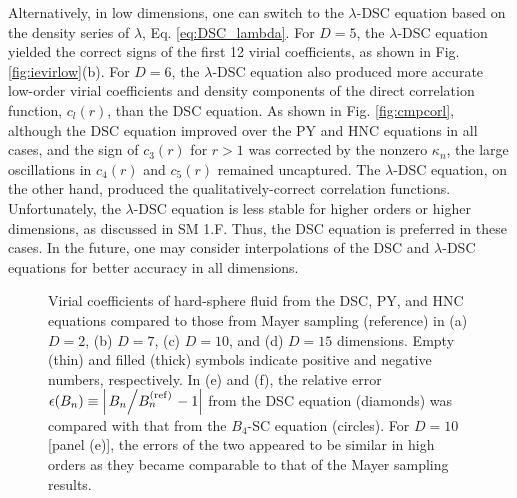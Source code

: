 \documentclass[aip,jcp,preprint,superscriptaddress,showpacs,preprintnumbers,amsmath,amssymb]{revtex4-1}
\begin{document}
Alternatively, in low dimensions,
one can switch to the $\lambda$-DSC equation
based on the density series of $\lambda$,
Eq. \eqref{eq:DSC_lambda}.
%
For $D = 5$,
the $\lambda$-DSC equation
yielded the correct signs of the first 12 virial coefficients,
as shown in Fig. \ref{fig:ievirlow}(b).
%
For $D = 6$,
the $\lambda$-DSC equation
also produced more accurate low-order virial coefficients
and density components of the direct correlation function,
$c_l(r)$, than the DSC equation.
%
As shown in Fig. \ref{fig:cmpcorl},
although the DSC equation improved over the PY and HNC equations
in all cases,
and the sign of $c_3(r)$ for $r > 1$ was corrected
by the nonzero $\kappa_n$,
the large oscillations in $c_4(r)$ and $c_5(r)$
remained uncaptured.
%
The $\lambda$-DSC equation,
on the other hand,
produced the qualitatively-correct correlation functions.
%
Unfortunately,
the $\lambda$-DSC equation
is less stable for higher orders or higher dimensions,
as discussed in SM 1.F.
%
Thus, the DSC equation is preferred in these cases.
%
In the future,
one may consider interpolations
of the DSC and $\lambda$-DSC equations
for better accuracy in all dimensions.





\begin{figure}[h]
  \caption{
    \label{fig:ievircmp}
    Virial coefficients of hard-sphere fluid
    from the DSC, PY, and HNC equations compared to those
    from Mayer sampling (reference) in
    (a) $D = 2$, (b) $D = 7$, (c) $D = 10$,
    and (d) $D = 15$ dimensions.
    Empty (thin) and filled (thick) symbols indicate
    positive and negative numbers, respectively.
    In (e) and (f),
    the relative error
    $\epsilon(B_n) \equiv
    \left|
      \left.
        B_n
      \middle/
        B_n^{(\mathrm{ref})}
      \right. - 1
    \right|$
    from the DSC equation (diamonds)
    was compared with that from
    the $B_4$-SC equation (circles).
    For $D = 10$ [panel (e)],
    the errors of the two appeared to be
    similar in high orders as they became
    comparable to that of the Mayer sampling results.
}
\end{figure}
\end{document}
